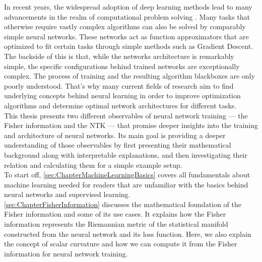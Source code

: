 In recent years, the widespread adoption of deep learning methods lead to many advancements in the realm of computational problem solving \cite{DeepLearning:DNA,DeepLearning:DrugRecognition,DeepLearning:ImageNetClassification,DeepLearning:Translation}. Many tasks that otherwise require vastly complex algorithms can also be solved by comparably simple neural networks. These networks act as function approximators that are optimized to fit certain tasks through simple methods such as Gradient Descent. The backside of this is that, while the networks architecture is remarkably simple, the specific configurations behind trained networks are exceptionally complex. The process of training and the resulting algorithm blackboxes are only poorly understood. That's why many current fields of research aim to find underlying concepts behind neural learning \cite{InterpretableAI} in order to improve optimization algorithms and determine optimal network architectures for different tasks.\\
This thesis presents two different observables of neural network training --- the Fisher information and the NTK --- that promise deeper insights into the training and architecture of neural networks. Its main goal is providing a deeper understanding of those observables by first presenting their mathematical background along with interpretable explanations, and then investigating their relation and calculating them for a simple example setup.\\
To start off, \cref{sec:ChapterMachineLearningBasics} covers all fundamentals about machine learning needed for readers that are unfamiliar with the basics behind neural networks and supervised learning.\\
\cref{sec:ChapterFisherInformation} discusses the mathematical foundation of the Fisher information and some of its use cases. It explains how the Fisher information represents the Riemannian metric of the statistical manifold constructed from the neural network and its loss function. Here, we also explain the concept of scalar curvature and how we can compute it from the Fisher information for neural network training. %
